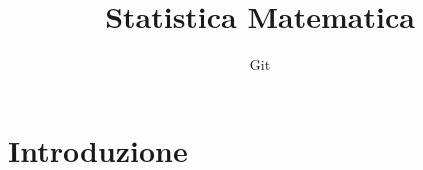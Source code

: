 \documentclass[11pt]{article}
\title{Statistica Matematica}
\author{Git}
\date{}
\begin{document}
\maketitle
\section{Introduzione}



\end{document}
